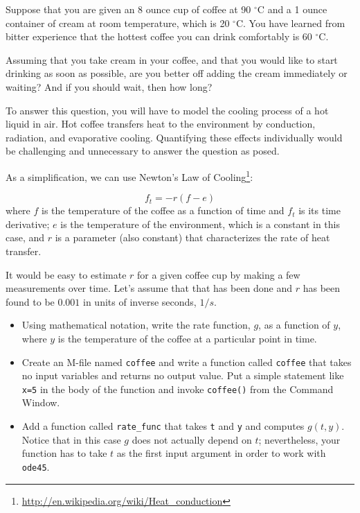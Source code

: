 \newcommand{\degree}{\ensuremath{^\circ}}

\begin{ex}
Suppose that you are given an 8 ounce cup of coffee at 90 \degree C and
a 1 ounce container of cream at room temperature, which is 20 \degree C.
You have learned from bitter experience that the hottest coffee you
can drink comfortably is 60 \degree C.

Assuming that you take cream in your coffee, and that you would like
to start drinking as soon as possible, are you better off adding
the cream immediately or waiting? And if you should wait, then how
long?

To answer this question, you will have to model the cooling process
of a hot liquid in air. Hot coffee transfers heat to the environment
by conduction, radiation, and evaporative cooling. Quantifying these
effects individually would be challenging and unnecessary to answer
the question as posed.

As a simplification, we can use Newton's Law of
Cooling\footnote{\url{http://en.wikipedia.org/wiki/Heat_conduction}}:

\[ f_t = -r (f - e) \]
%
where $f$ is the temperature of the coffee as a function of time and
$f_t$ is its time derivative; $e$ is the temperature of the
environment, which is a constant in this case, and $r$ is a parameter
(also constant) that characterizes the rate of heat transfer.

It would be easy to estimate $r$ for a given coffee cup by making
a few measurements over time. Let's assume that that has been
done and $r$ has been found to be $0.001$ in units of inverse
seconds, $1/s$.

\begin{itemize}

\item Using mathematical notation, write the rate function, $g$,
as a function of $y$, where $y$ is the temperature of the
coffee at a particular point in time.

\item Create an M-file named {\tt coffee} and write a function
called {\tt coffee} that takes no input variables and returns no
output value. Put a simple statement like {\tt x=5} in the body
of the function and invoke {\tt coffee()} from the Command Window.

\item Add a function called
{\tt rate\_func} that takes {\tt t} and {\tt y} and computes
$g(t,y)$. Notice that in this case $g$ does not actually
depend on $t$; nevertheless, your function has to take $t$ as
the first input argument in order to work with {\tt ode45}.


\end{itemize}
\end{ex}
